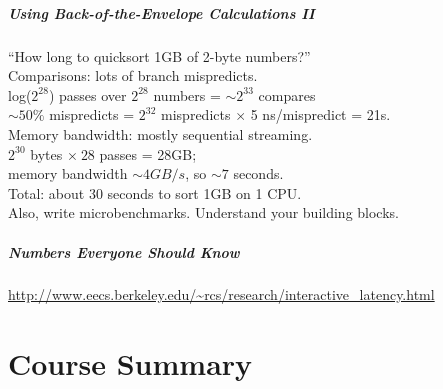 \documentclass[aspectratio=43]{beamer}
\newenvironment{changemargin}[1]{%
  \begin{list}{}{%
    \setlength{\topsep}{0pt}%
    \setlength{\leftmargin}{#1}%
    \setlength{\rightmargin}{1em}
    \setlength{\listparindent}{\parindent}%
    \setlength{\itemindent}{\parindent}%
    \setlength{\parsep}{\parskip}%
  }%
  \item[]}{\end{list}}
\begin{document}
\begin{frame}
  \frametitle{Using Back-of-the-Envelope Calculations II}

  \begin{changemargin}{1cm}
    ``How long to quicksort 1GB of 2-byte numbers?''\\[1em]

    Comparisons: lots of branch mispredicts.\\
    \quad log($2^{28}$) passes over $2^{28}$ numbers = $\sim 2^{33}$ compares\\
    \quad $\sim 50\%$ mispredicts = $2^{32}$ mispredicts $\times$ 5 ns/mispredict = 21s.\\[1em]

    Memory bandwidth: mostly sequential streaming.\\
    \quad $2^{30}$ bytes $\times ~28$ passes = 28GB; \\
    \quad memory bandwidth $\sim 4GB/s$, so $\sim 7$ seconds.\\[1em]

    Total: about 30 seconds to sort 1GB on 1 CPU.\\[1em]

    Also, write microbenchmarks. Understand your building blocks.

  \end{changemargin}
\end{frame}


\begin{frame}
  \frametitle{Numbers Everyone Should Know}

\begin{center}
\scriptsize \url{http://www.eecs.berkeley.edu/~rcs/research/interactive_latency.html}
\end{center}
\end{frame}

\part{Course Summary}
\frame{\partpage}
\end{document}
